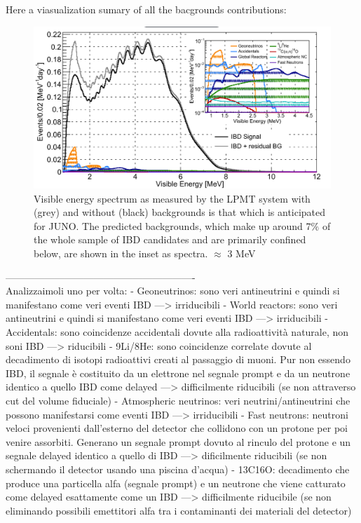 Here a viasualization sumary of all the bacgrounds contributions:

\begin{figure}[h]
	\centering
	\includegraphics[width=0.7\linewidth]{Images/backgrounds_spectrum}
	\caption{Visible energy spectrum as measured by the LPMT system with (grey) and without (black) backgrounds is that which is anticipated for JUNO. The predicted backgrounds, which make up around 7$\%$ of the whole sample of IBD candidates and are primarily confined below, are shown in the inset as spectra. $\approx$ 3 MeV}
	\label{fig:backgroundsspectrum}
\end{figure}

----------------------------------------------------------\\
Analizzaimoli uno per volta:
- Geoneutrinos: sono veri antineutrini e quindi si manifestano come veri eventi IBD —> irriducibili
- World reactors: sono veri antineutrini e quindi si manifestano come veri eventi IBD —> irriducibili
- Accidentals: sono coincidenze accidentali dovute alla radioattività naturale, non soni IBD —> riducibili
- 9Li/8He: sono coincidenze correlate dovute al decadimento di isotopi radioattivi creati al passaggio di muoni. Pur non essendo IBD, il segnale è costituito da un elettrone nel segnale prompt e da un neutrone identico a quello IBD come delayed —> difficilmente riducibili (se non attraverso cut del volume fiduciale)
- Atmospheric neutrinos: veri neutrini/antineutrini che possono manifestarsi come eventi IBD —> irriducibili
- Fast neutrons: neutroni veloci provenienti dall'esterno del detector che collidono con un protone per poi venire assorbiti. Generano un segnale prompt dovuto al rinculo del protone e un segnale delayed identico a quello di IBD —> dificilmente riducibili (se non schermando il detector usando una piscina d'acqua)
- 13C16O: decadimento che produce una particella alfa (segnale prompt) e un neutrone che viene catturato come delayed esattamente come un IBD —> difficilmente riducibile (se non eliminando possibili emettitori alfa tra i contaminanti dei materiali del detector)


